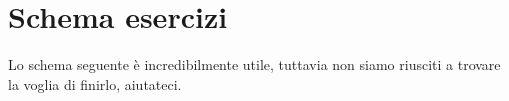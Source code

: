 \documentclass[10pt,a4paper,twoside,openright]{book}
\newcounter{es}
\numberwithin{es}{chapter}
\begin{document}
\AtEndDocument{\cleardoublepage}


\mainmatter
\pagestyle{fancy} %






\chapter*{Schema esercizi}
Lo schema seguente è incredibilmente utile, tuttavia non siamo riusciti a trovare la voglia di finirlo, aiutateci.

\end{document}
